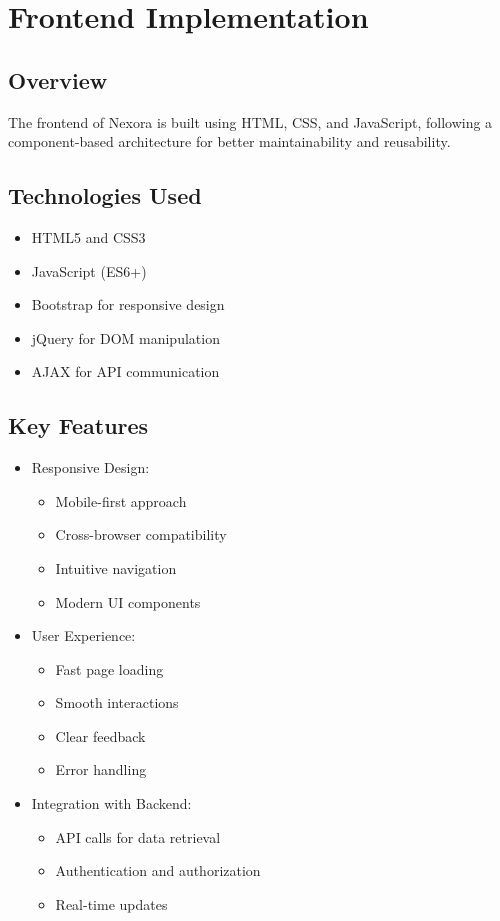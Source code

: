 \chapter{Frontend Implementation}

\section{Overview}
The frontend of Nexora is built using HTML, CSS, and JavaScript, following a component-based architecture for better maintainability and reusability.

\section{Technologies Used}
\begin{itemize}
    \item HTML5 and CSS3
    \item JavaScript (ES6+)
    \item Bootstrap for responsive design
    \item jQuery for DOM manipulation
    \item AJAX for API communication
\end{itemize}

\section{Key Features}
\begin{itemize}
    \item Responsive Design:
    \begin{itemize}
        \item Mobile-first approach
        \item Cross-browser compatibility
        \item Intuitive navigation
        \item Modern UI components
    \end{itemize}
    \item User Experience:
    \begin{itemize}
        \item Fast page loading
        \item Smooth interactions
        \item Clear feedback
        \item Error handling
    \end{itemize}
    \item Integration with Backend:
    \begin{itemize}
        \item API calls for data retrieval
        \item Authentication and authorization
        \item Real-time updates
    \end{itemize}
\end{itemize}

